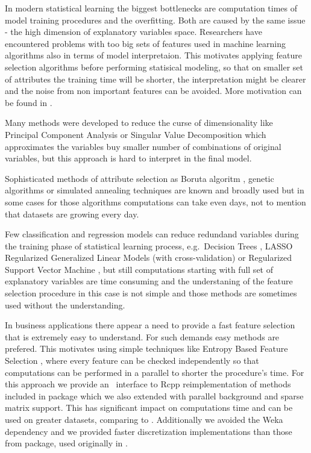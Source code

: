 In modern statistical learning the biggest bottlenecks are computation
times of model training procedures and the overfitting. Both are caused
by the same issue - the high dimension of explanatory variables space.
Researchers have encountered problems with too big sets of features used
in machine learning algorithms also in terms of model interpretaion.
This motivates applying feature selection algorithms before performing
statisical modeling, so that on smaller set of attributes the training
time will be shorter, the interpretation might be clearer and the noise
from non important features can be avoided. More motivation can be found
in \cite{John94irrelevantfeatures}. \par Many methods were developed to
reduce the curse of dimensionality like Principal Component Analysis
\citep{PCA:14786440109462720} or Singular Value Decomposition
\citep{eckart1936approximation} which approximates the variables buy
smaller number of combinations of original variables, but this approach
is hard to interpret in the final model. \par Sophisticated methods of
attribute selection as Boruta algoritm \citep{Boruta}, genetic
algorithms \citep{geneticAlgo, FedCSIS2013l106} or simulated annealing
techniques \citep{Khachaturyan:a19748} are known and broadly used but in
some cases for those algorithms computations can take even days, not to
mention that datasets are growing every day. \par Few classification and
regression models can reduce redundand variables during the training
phase of statistical learning process, e.g.~Decision Trees
\citep{Rokach:2008:DMD:1796114, cart84}, LASSO Regularized Generalized
Linear Models (with cross-validation) \citep{glmnet} or Regularized
Support Vector Machine \citep{Xu:2009:RRS:1577069.1755834}, but still
computations starting with full set of explanatory variables are time
consuming and the understaning of the feature selection procedure in
this case is not simple and those methods are sometimes used without the
understanding. \par In business applications there appear a need to
provide a fast feature selection that is extremely easy to understand.
For such demands easy methods are prefered. This motivates using simple
techniques like Entropy Based Feature Selection
\citep{Largeron:2011:EBF:1982185.1982389}, where every feature can be
checked independently so that computations can be performed in a
parallel to shorter the procedure's time. For this approach we provide
an \R ~interface to Rcpp reimplementation of methods included in
 package which we also extended with parallel background
and sparse matrix support. This has significant impact on computations
time and can be used on greater datasets, comparing to .
Additionally we avoided the Weka \citep{Hall:2009:WDM:1656274.1656278}
dependency and we provided faster discretization implementations than
those from  package, used originally in .

